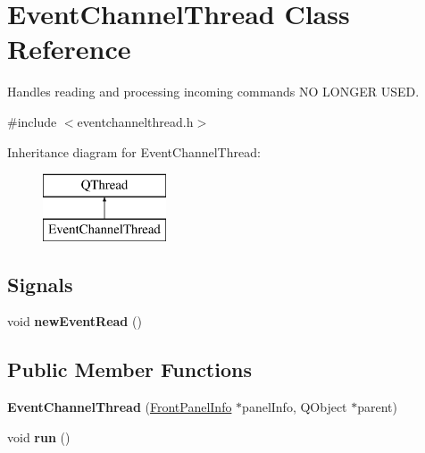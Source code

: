 \hypertarget{class_event_channel_thread}{\section{Event\-Channel\-Thread Class Reference}
\label{class_event_channel_thread}
}


Handles reading and processing incoming commands N\-O L\-O\-N\-G\-E\-R U\-S\-E\-D.  




{\ttfamily \#include $<$eventchannelthread.\-h$>$}

Inheritance diagram for Event\-Channel\-Thread\-:\begin{figure}[H]
\begin{center}
\leavevmode
\includegraphics[height=2.000000cm]{class_event_channel_thread}
\end{center}
\end{figure}
\subsection*{Signals}
\begin{DoxyCompactItemize}
\item 
\hypertarget{class_event_channel_thread_afd7ce64ba747260fdacd89a39368615c}{void {\bfseries new\-Event\-Read} ()}\label{class_event_channel_thread_afd7ce64ba747260fdacd89a39368615c}

\end{DoxyCompactItemize}
\subsection*{Public Member Functions}
\begin{DoxyCompactItemize}
\item 
\hypertarget{class_event_channel_thread_a3eefa94fc53d48e1a9c42447e06f9791}{{\bfseries Event\-Channel\-Thread} (\hyperlink{class_front_panel_info}{Front\-Panel\-Info} $\ast$panel\-Info, Q\-Object $\ast$parent)}\label{class_event_channel_thread_a3eefa94fc53d48e1a9c42447e06f9791}

\item 
\hypertarget{class_event_channel_thread_a12e59339aae1090b3dd94bc067c1a97e}{void {\bfseries run} ()}\label{class_event_channel_thread_a12e59339aae1090b3dd94bc067c1a97e}

\end{DoxyCompactItemize}


